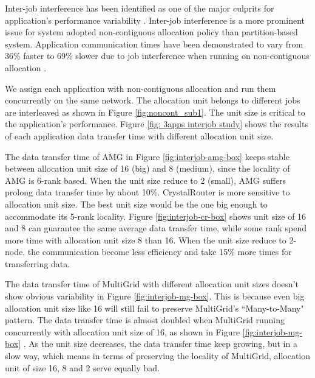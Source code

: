 \documentclass[conference]{IEEEtran}
\begin{document}
Inter-job interference has been identified as one of the major culprits for application's performance variability \cite{abhinav-sc13}\cite{skinner}\cite{rosenthal}. Inter-job interference is a more prominent issue for system adopted non-contiguous allocation policy than partition-based system. Application communication times have been demonstrated to vary from 36\% faster to 69\% slower due to job interference when running on non-contiguous allocation \cite{abhinav-sc13}.

We assign each application with non-contiguous allocation and run them concurrently on the same network. The allocation unit belongs to different jobs are interleaved as shown in Figure \ref{fig:noncont_sub1}. The unit size is critical to the application's performance. Figure \ref{fig: 3apps interjob study} shows the results of each application data transfer time with different allocation unit size. 

The data transfer time of AMG in Figure \ref{fig:interjob-amg-box} keeps stable between allocation unit size of 16 (big) and 8 (medium), since the locality of AMG is 6-rank based. When the unit size reduce to 2 (small), AMG suffers prolong data transfer time by about 10\%. CrystalRouter is more sensitive to allocation unit size. The best unit size would be the one big enough to accommodate its 5-rank locality. Figure \ref{fig:interjob-cr-box} shows unit size of 16 and 8 can guarantee the same average data transfer time, while some rank spend more time with allocation unit size 8 than 16. When the unit size reduce to 2-node, the communication become less efficiency and take 15\% more times for transferring data. 

The data transfer time of MultiGrid with different allocation unit sizes doesn't show obvious variability in Figure \ref{fig:interjob-mg-box}. This is because even big allocation unit size like 16 will still fail to preserve MultiGrid's ``Many-to-Many" pattern. The data transfer time is almost doubled when MultiGrid running concurrently with allocation unit size of 16, as shown in Figure \ref{fig:interjob-mg-box} . As the unit size decreases, the data transfer time keep growing, but in a slow way, which means in terms of preserving the locality of MultiGrid, allocation unit of size 16, 8 and 2 serve equally bad.
\end{document}
